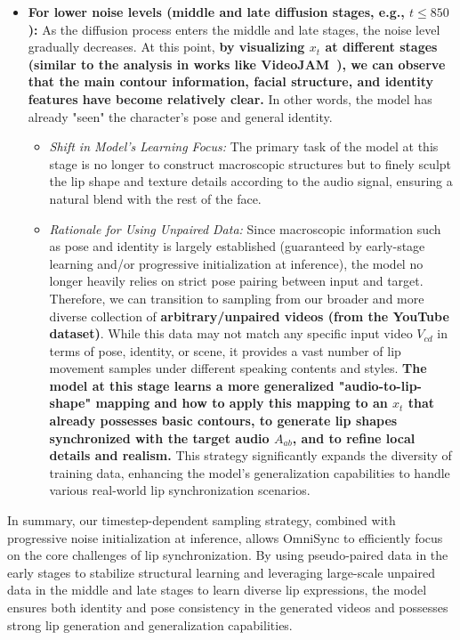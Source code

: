 \begin{itemize}
    \item \textbf{For lower noise levels (middle and late diffusion stages, e.g., $t \leq 850$):} As the diffusion process enters the middle and late stages, the noise level gradually decreases. At this point, \textbf{by visualizing $x_t$ at different stages (similar to the analysis in works like VideoJAM~\cite{chefer2025videojam}), we can observe that the main contour information, facial structure, and identity features have become relatively clear.} In other words, the model has already "seen" the character's pose and general identity.
    \begin{itemize}
        \item \textit{Shift in Model's Learning Focus:} The primary task of the model at this stage is no longer to construct macroscopic structures but to finely sculpt the lip shape and texture details according to the audio signal, ensuring a natural blend with the rest of the face.
        \item \textit{Rationale for Using Unpaired Data:} Since macroscopic information such as pose and identity is largely established (guaranteed by early-stage learning and/or progressive initialization at inference), the model no longer heavily relies on strict pose pairing between input and target. Therefore, we can transition to sampling from our broader and more diverse collection of \textbf{arbitrary/unpaired videos (from the YouTube dataset)}. While this data may not match any specific input video $V_{cd}$ in terms of pose, identity, or scene, it provides a vast number of lip movement samples under different speaking contents and styles. \textbf{The model at this stage learns a more generalized "audio-to-lip-shape" mapping and how to apply this mapping to an $x_t$ that already possesses basic contours, to generate lip shapes synchronized with the target audio $A_{ab}$, and to refine local details and realism.} This strategy significantly expands the diversity of training data, enhancing the model's generalization capabilities to handle various real-world lip synchronization scenarios.
    \end{itemize}
\end{itemize}

In summary, our timestep-dependent sampling strategy, combined with progressive noise initialization at inference, allows OmniSync to efficiently focus on the core challenges of lip synchronization. By using pseudo-paired data in the early stages to stabilize structural learning and leveraging large-scale unpaired data in the middle and late stages to learn diverse lip expressions, the model ensures both identity and pose consistency in the generated videos and possesses strong lip generation and generalization capabilities.



